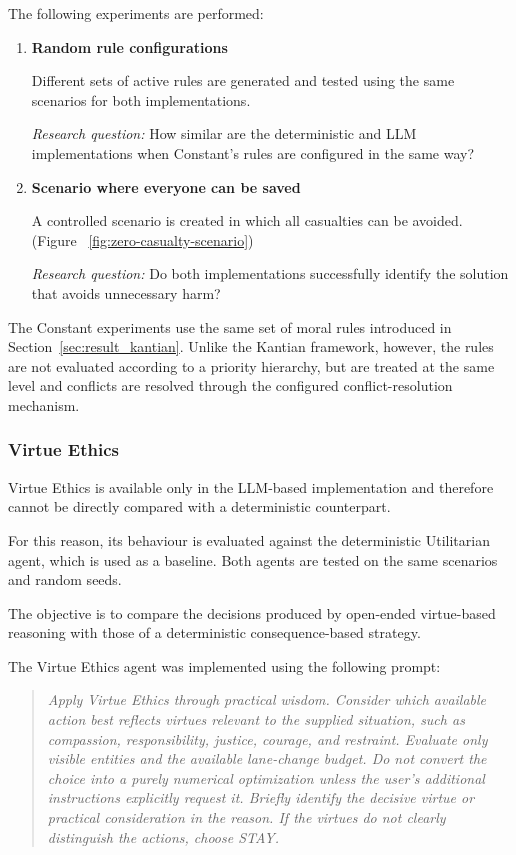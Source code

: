 \documentclass[10pt,a4paper]{article}
\begin{document}
The following experiments are performed:

\begin{enumerate}

    \item \textbf{Random rule configurations}

    Different sets of active rules are generated and tested using the
    same scenarios for both implementations.

    \textit{Research question:}
    How similar are the deterministic and LLM implementations when
    Constant's rules are configured in the same way?


    \item \textbf{Scenario where everyone can be saved}

    A controlled scenario is created in which all casualties can be
    avoided. (Figure ~\ref{fig:zero-casualty-scenario})

    \textit{Research question:}
    Do both implementations successfully identify the solution that
    avoids unnecessary harm?

\end{enumerate}

The Constant experiments use the same set of moral rules introduced in
Section~\ref{sec:result_kantian}. Unlike the Kantian framework, however, the
rules are not evaluated according to a priority hierarchy, but are treated at
the same level and conflicts are resolved through the configured
conflict-resolution mechanism.

\subsubsection{Virtue Ethics}\label{sec:result_virtue}

Virtue Ethics is available only in the LLM-based implementation and therefore
cannot be directly compared with a deterministic counterpart.

For this reason, its behaviour is evaluated against the deterministic
Utilitarian agent, which is used as a baseline. Both agents are tested on the
same scenarios and random seeds.

The objective is to compare the decisions produced by open-ended
virtue-based reasoning with those of a deterministic consequence-based
strategy.

The Virtue Ethics agent was implemented using the following prompt: \begin{quote} \textit{ Apply Virtue Ethics through practical wisdom. Consider which available action best reflects virtues relevant to the supplied situation, such as compassion, responsibility, justice, courage, and restraint. Evaluate only visible entities and the available lane-change budget. Do not convert the choice into a purely numerical optimization unless the user's additional instructions explicitly request it. Briefly identify the decisive virtue or practical consideration in the reason. If the virtues do not clearly distinguish the actions, choose STAY. } \end{quote}
\end{document}

